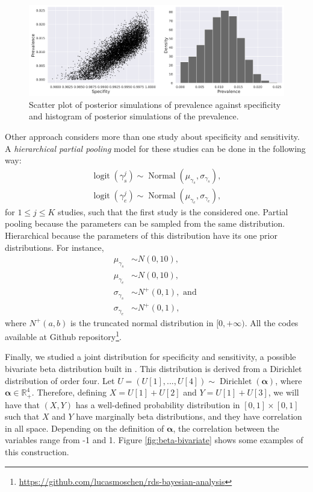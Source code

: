\begin{figure}[!ht]
  \centering
  \includegraphics[width=\textwidth]{../../images/model1_gelman_figure_english.png}
  \caption{Scatter plot of posterior simulations of prevalence against
  specificity and histogram of posterior simulations of the prevalence.}
  \label{fig:results-posterior-model1}
\end{figure}

Other approach considers more than one study about specificity and
sensitivity. A {\em hierarchical partial pooling} model for these studies
can be done in the following way: 
\begin{gather*}
    \operatorname{logit}(\gamma_s^j) \sim \operatorname{Normal}(\mu_{\gamma_s}, \sigma_{\gamma_s}), \\
    \operatorname{logit}(\gamma_e^j) \sim \operatorname{Normal}(\mu_{\gamma_e}, \sigma_{\gamma_e}), 
\end{gather*}
for $1 \le j \le K$ studies, such that the first study is the considered one.
Partial pooling because the parameters can be sampled from the same
distribution. Hierarchical because the parameters of this distribution have
its one prior distributions. For instance, 
\begin{align*}
    \mu_{\gamma_s} &\sim N(0, 10), \\ 
    \mu_{\gamma_e} &\sim N(0, 10), \\
    \sigma_{\gamma_s} &\sim N^+(0,1), \text{ and } \\
    \sigma_{\gamma_e} &\sim N^+(0,1),
\end{align*}
where $N^+(a,b)$ is the truncated normal distribution in $[0,+\infty)$. All
the codes available at Github
repository\footnote{\url{https://github.com/lucasmoschen/rds-bayesian-analysis}}.

Finally, we studied a joint distribution for specificity and sensitivity, a
possible bivariate beta distribution built in \cite{olkin2015constructions}.
This distribution is derived from a Dirichlet distribution of order four. Let $U = (U[1],...,U[4]) \sim \operatorname{Dirichlet}(\boldsymbol{\alpha})$, where
$\boldsymbol{\alpha} \in \mathbb{R}^4_+$. Therefore, defining $X = U[1] +
U[2]$ and $Y = U[1] + U[3]$, we will have that $(X,Y)$ has a well-defined
probability distribution in
$[0,1] \times [0,1]$ such that $X$ and $Y$ have marginally beta distributions,
and they have correlation in all space. Depending on the definition of
$\boldsymbol{\alpha}$, the correlation between the variables range from -1 and
1. Figure \ref{fig:beta-bivariate} shows some examples of this construction. 

